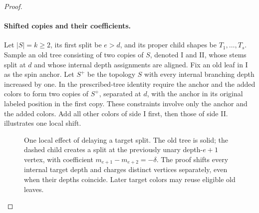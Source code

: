 \begin{proof}
\paragraph{Shifted copies and their coefficients.}
Let $|S|=k\ge2$, its first split be $e>d$, and its proper child shapes
be $T_1,\ldots,T_s$.  Sample an old tree consisting of two copies of
$S$, denoted I and II, whose stems split at $d$ and whose internal
depth assignments are aligned.  Fix an old leaf in I as the spin
anchor.  Let $S^+$ be the topology $S$ with every internal branching
depth increased by one.  In the prescribed-tree identity require
the anchor and the added colors to form two copies of $S^+$,
separated at $d$, with the anchor in its original labeled position
in the first copy.  These constraints involve only the anchor and
the added colors.  Add all other colors of side I first, then those
of side II.  illustrates one local shift.

\begin{figure}[!ht]
\centering
{}
\caption{One local effect of delaying a target split. The old tree is solid;
the dashed child creates a split at the previously unary depth-$e+1$ vertex,
with coefficient $m_{e+1}-m_{e+2}=-\delta$.
The proof shifts every internal target depth and charges distinct vertices
separately, even when their depths coincide. Later target colors may reuse
eligible old leaves.}
\label{decor:shift-figure}
\end{figure}


\end{proof}
